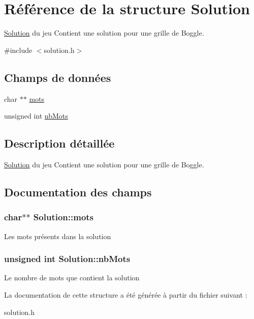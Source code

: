 \hypertarget{structSolution}{
\section{Référence de la structure Solution}
\label{structSolution}
}


\hyperlink{structSolution}{Solution} du jeu Contient une solution pour une grille de Boggle.  




{\ttfamily \#include $<$solution.h$>$}

\subsection*{Champs de données}
\begin{DoxyCompactItemize}
\item 
char $\ast$$\ast$ \hyperlink{structSolution_ab511245410043c846351c6acf272d656}{mots}
\item 
unsigned int \hyperlink{structSolution_a60e0881a49e593091d2210dd49f2f51a}{nbMots}
\end{DoxyCompactItemize}


\subsection{Description détaillée}
\hyperlink{structSolution}{Solution} du jeu Contient une solution pour une grille de Boggle. 

\subsection{Documentation des champs}
\hypertarget{structSolution_ab511245410043c846351c6acf272d656}{
\subsubsection[{mots}]{\setlength{\rightskip}{0pt plus 5cm}char$\ast$$\ast$ {\bf Solution::mots}}}
\label{structSolution_ab511245410043c846351c6acf272d656}
Les mots présents dans la solution \hypertarget{structSolution_a60e0881a49e593091d2210dd49f2f51a}{
\subsubsection[{nbMots}]{\setlength{\rightskip}{0pt plus 5cm}unsigned int {\bf Solution::nbMots}}}
\label{structSolution_a60e0881a49e593091d2210dd49f2f51a}
Le nombre de mots que contient la solution 

La documentation de cette structure a été générée à partir du fichier suivant :\begin{DoxyCompactItemize}
\item 
solution.h\end{DoxyCompactItemize}
